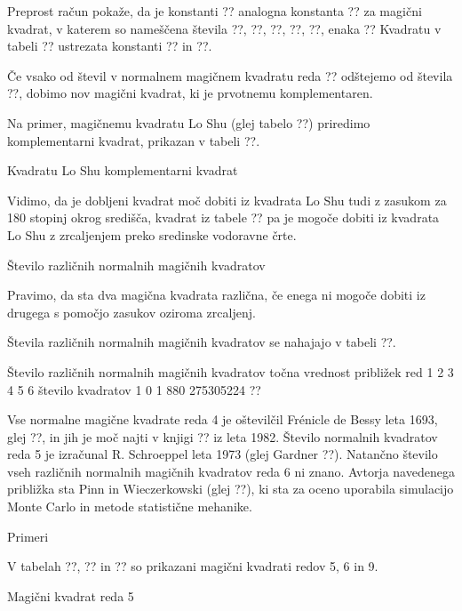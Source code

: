 \documentclass[a4paper,12pt]{article}
\begin{document}
Preprost račun pokaže, da je konstanti ?? analogna konstanta
?? za magični kvadrat, v katerem so nameščena števila
??, ??, ??, ??, ??, enaka
??
Kvadratu v tabeli ?? ustrezata konstanti ?? in ??.

   Če vsako od števil v normalnem magičnem kvadratu reda ?? odštejemo
   od števila ??, dobimo nov magični kvadrat, ki je prvotnemu
   komplementaren.

Na primer, magičnemu kvadratu Lo Shu (glej tabelo ??) priredimo
komplementarni kvadrat, prikazan v tabeli ??.

Kvadratu Lo Shu komplementarni kvadrat

Vidimo, da je dobljeni kvadrat moč dobiti iz kvadrata Lo Shu tudi z zasukom za
180 stopinj okrog središča, kvadrat iz tabele ?? pa je mogoče dobiti
iz kvadrata Lo Shu z zrcaljenjem preko sredinske vodoravne črte.

Število različnih normalnih magičnih kvadratov

   Pravimo, da sta dva magična kvadrata različna, če enega ni mogoče dobiti
   iz drugega s pomočjo zasukov oziroma zrcaljenj.

Števila različnih normalnih magičnih kvadratov se nahajajo v tabeli ??.

   Število različnih normalnih magičnih kvadratov
      točna vrednost približek
      red 1 2 3 4 5 6
      število kvadratov 1 0 1 880 275305224 ??

Vse normalne magične kvadrate reda 4 je oštevilčil Frénicle de Bessy
leta 1693, glej ??, in jih je moč najti v knjigi ??
iz leta 1982. Število normalnih kvadratov reda 5 je izračunal
R. Schroeppel leta 1973 (glej Gardner ??).
Natančno število vseh različnih normalnih magičnih kvadratov reda 6 ni znano.
Avtorja navedenega približka sta Pinn in Wieczerkowski (glej ??), ki
sta za oceno uporabila simulacijo Monte Carlo in metode statistične mehanike.


Primeri

V tabelah ??, ?? in ?? so prikazani
magični kvadrati redov 5, 6 in 9.

Magični kvadrat reda 5
\end{document}
